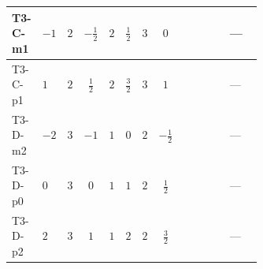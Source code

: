 \documentclass[8pt]{article}
\begin{document}
\begin{landscape}
\begin{longtable}{@{}llcccccc >{\raggedright\arraybackslash}p{0.21\linewidth} >{\raggedright\arraybackslash}p{0.21\linewidth} >{\raggedright\arraybackslash}p{0.21\linewidth}@{}}
\midrule
T3-C-m1 & $-1$ & $2$ & $-\frac{1}{2}$ & $2$ & $\frac{1}{2}$ & $3$ & $0$ & \scriptsize\adjustbox{max width=\linewidth}{$\begin{gathered} +4 {\lambda_{HS_2}^{(1)}}^2\end{gathered}$} & \scriptsize\adjustbox{max width=\linewidth}{$\begin{gathered} +6 {\lambda_{HS_2}^{(1)}} {\lambda_{S_2}^{(1)}}\end{gathered}$} & --- \\
\midrule
T3-C-p1 & $1$ & $2$ & $\frac{1}{2}$ & $2$ & $\frac{3}{2}$ & $3$ & $1$ & \scriptsize\adjustbox{max width=\linewidth}{$\begin{gathered} +4 {\lambda_{HS_2}^{(1)}}^2\end{gathered}$} & \scriptsize\adjustbox{max width=\linewidth}{$\begin{gathered} +6 {\lambda_{HS_2}^{(1)}} {\lambda_{S_2}^{(1)}}\end{gathered}$} & --- \\
\midrule
T3-D-m2 & $-2$ & $3$ & $-1$ & $1$ & $0$ & $2$ & $-\frac{1}{2}$ & \scriptsize\adjustbox{max width=\linewidth}{$\begin{gathered} +4 {\lambda_{HS_2}^{(1)}}^2\end{gathered}$} & \scriptsize\adjustbox{max width=\linewidth}{$\begin{gathered} +4 {\lambda_{HS_2}^{(1)}} {\lambda_{S_2}^{(1)}}\end{gathered}$} & --- \\
\midrule
T3-D-p0 & $0$ & $3$ & $0$ & $1$ & $1$ & $2$ & $\frac{1}{2}$ & \scriptsize\adjustbox{max width=\linewidth}{$\begin{gathered} +4 {\lambda_{HS_2}^{(1)}}^2\end{gathered}$} & \scriptsize\adjustbox{max width=\linewidth}{$\begin{gathered} +4 {\lambda_{HS_2}^{(1)}} {\lambda_{S_2}^{(1)}}\end{gathered}$} & --- \\
\midrule
T3-D-p2 & $2$ & $3$ & $1$ & $1$ & $2$ & $2$ & $\frac{3}{2}$ & \scriptsize\adjustbox{max width=\linewidth}{$\begin{gathered} +4 {\lambda_{HS_2}^{(1)}}^2\end{gathered}$} & \scriptsize\adjustbox{max width=\linewidth}{$\begin{gathered} +4 {\lambda_{HS_2}^{(1)}} {\lambda_{S_2}^{(1)}}\end{gathered}$} & --- \\
\midrule

\end{longtable}
\end{landscape}
\end{document}
